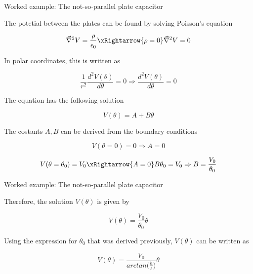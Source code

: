 {%
%
%

\begin{frame}{Worked example: The not-so-parallel plate capacitor}

The potetial between the plates can be found by solving Poisson's equation

  \begin{equation*}
    \vec{\nabla}^{2} V = \frac{\rho}{\epsilon_0} \xRightarrow{\rho=0}
    \vec{\nabla}^{2} V = 0
  \end{equation*}

In polar coordinates, this is written as

  \begin{equation*}
    \frac{1}{r^2} \frac{d^2V(\theta)}{d\theta} = 0 \Rightarrow
    \frac{d^2V(\theta)}{d\theta} = 0
  \end{equation*}

\vspace{0.2cm}

The equation has the following solution

  \begin{equation*}
    V(\theta) = A + B \theta
  \end{equation*}

The costants $A, B$ can be derived from the boundary conditions

  \begin{equation*}
    V(\theta = 0) = 0 \Rightarrow A = 0
  \end{equation*}

  \begin{equation*}
    V(\theta = \theta_0) = V_0 \xRightarrow{A = 0}
    B \theta_0 = V_0 \Rightarrow B = \frac{V_0}{\theta_0}
  \end{equation*}

\end{frame}

%
%
%

\begin{frame}{Worked example: The not-so-parallel plate capacitor}

Therefore, the solution $V(\theta)$ is given by

  \begin{equation*}
    V(\theta) =  \frac{V_0}{\theta_0} \theta
  \end{equation*}

Using the expression for $\theta_0$ that was derived previously,
$V(\theta)$ can be written as

  \begin{equation*}
    V(\theta) =  \frac{V_0}{arctan\Big(\frac{h}{\ell}\Big)} \theta
  \end{equation*}


\end{frame}}
